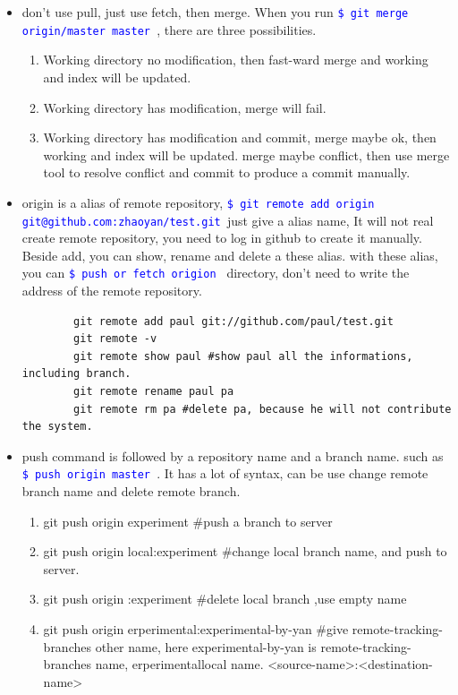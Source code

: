 \documentclass[a4paper,11pt,twoside]{book}
\newcommand{\linuxcommand}[1]{\texttt{\textcolor{blue}{\$ #1 \Pisymbol{psy}{191}}}}
\begin{document}
\begin{itemize}
	\item don't use pull, just use fetch, then merge.  When you run \linuxcommand{git merge origin/master master}, there are three possibilities. 
	\begin{enumerate}
		\item Working directory no modification, then fast-ward merge and working and index will be updated. 
		\item Working directory has modification, merge will fail. 
		\item Working directory has modification and commit, merge maybe ok, then working and index will be updated. merge maybe conflict, then use merge tool to resolve conflict and commit to produce a commit manually.
	\end{enumerate}
	
	\item origin is a alias of remote repository,  \linuxcommand{git remote add origin git@github.com:zhaoyan/test.git}just give a alias name, It will not real create remote repository, you need to log in github to create it manually.  Beside add, you can show, rename and delete a these alias. with these alias, you can \linuxcommand{push or fetch origion} directory, don't need to write the address of the remote repository.
	
	\begin{verbatim}
		git remote add paul git://github.com/paul/test.git
		git remote -v
		git remote show paul #show paul all the informations, including branch.
		git remote rename paul pa
		git remote rm pa #delete pa, because he will not contribute the system.
	\end{verbatim}
	
	\item push command is followed by a repository name and a branch name.  such as \linuxcommand{push origin master}. It has a lot of syntax, can be use change remote branch name and delete remote branch.
	\begin{enumerate}
		\item git push origin experiment \#push a branch to server
		\item git push origin local:experiment \#change local branch name, and push to server. 
		\item git push origin :experiment \#delete local branch ,use empty name 
		\item git push origin erperimental:experimental-by-yan \#give remote-tracking-branches other name, here experimental-by-yan is remote-tracking-branches name, erperimentallocal name. <source-name>:<destination-name>
	\end{enumerate}
	
\end{itemize}
\end{document}
